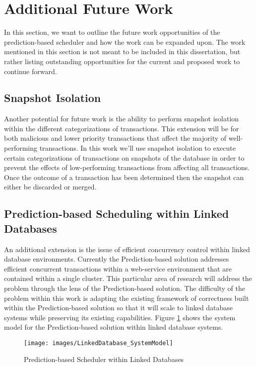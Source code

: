 \section{Additional Future Work}

In this section, we want to outline the future work opportunities of the prediction-based scheduler and how the work can be expanded upon. The work mentioned in this section is not meant to be included in this dissertation, but rather listing outstanding opportunities for the current and proposed work to continue forward.

\subsection{Snapshot Isolation}
Another potential for future work is the ability to perform snapshot isolation within the different categorizations of transactions. This extension will be for both malicious and lower priority transactions that affect the majority of well-performing transactions. In this work we'll use snapshot isolation to execute certain categorizations of transactions on snapshots of the database in order to prevent the effects of low-performing transactions from affecting all transactions. Once the outcome of a transaction has been determined then the snapshot can either be discarded or merged.

\subsection{Prediction-based Scheduling within Linked Databases}
An additional extension is the issue of efficient concurrency control within linked database environments. Currently the Prediction-based solution addresses efficient concurrent transactions within a web-service environment that are contained within a single cluster. This particular area of research will address the problem through the lens of the Prediction-based solution. The difficulty of the problem within this work is adapting the existing framework of correctness built within the Prediction-based solution so that it will scale to linked database systems while preserving its existing capabilities. Figure \ref{fig:system_model_linked_databases} shows the system model for the Prediction-based solution within linked database systems.

\begin{figure}[h]
\captionsetup{justification=centering}
\centering
\texttt{[image: images/LinkedDatabase\_SystemModel]}
\caption{Prediction-based Scheduler within Linked Databases}
\label{fig:system_model_linked_databases}
\end{figure}

